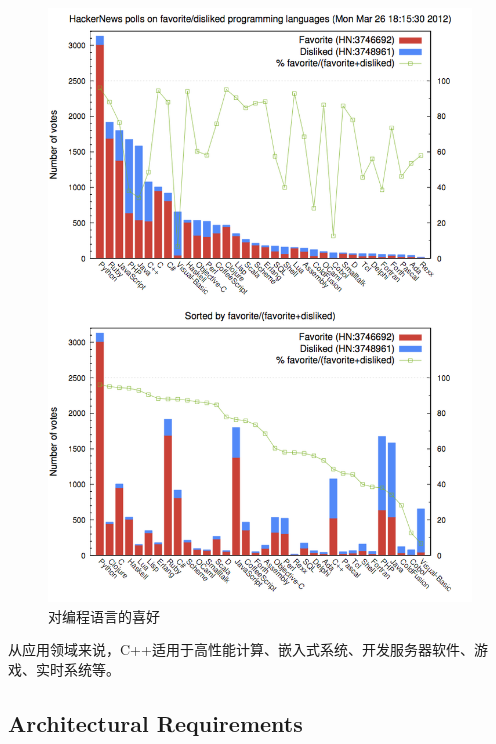 \documentclass{book}
\begin{document}
\begin{figure}[htbp]
	\centering
	\includegraphics[scale=1]{YourFavoriteDislikeProgramLanguage.png}
	\caption{对编程语言的喜好}
	\label{fig:YourFavoriteDislikeProgramLanguage}
\end{figure}

从应用领域来说，C++适用于高性能计算、嵌入式系统、开发服务器软件、游戏、实时系统等。

\subsection{Architectural Requirements}
\end{document}
